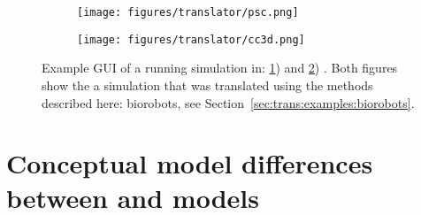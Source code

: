 
\begin{figure}[H]
    \centering
    \begin{subfigure}{.7\textwidth}
        \texttt{[image: figures/translator/psc.png]}
        \caption{}\label{fig:trans:model-vis:psc}
    \end{subfigure}
    \begin{subfigure}{.7\textwidth}
        \texttt{[image: figures/translator/cc3d.png]}
        \caption{}\label{fig:trans:model-vis:cc3d}
    \end{subfigure}
    \caption{Example GUI of a running simulation in: \ref{fig:trans:model-vis:psc}) \pscs and \ref{fig:trans:model-vis:cc3d}) \ccd. Both figures show the a simulation that was translated using the methods described here: biorobots, see Section~\ref{sec:trans:examples:biorobots}.}
    \label{fig:trans:model-vis}
\end{figure}




\section{Conceptual model differences between \ccds and \pscs models}\label{sec:trans:dif}

